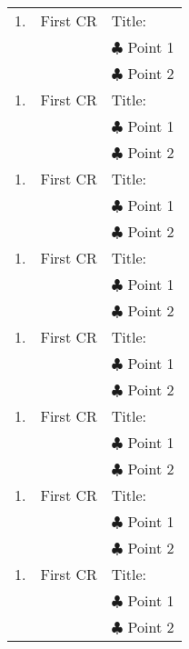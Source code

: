 \begin{longtable}{| c | c | L{11cm} |}
	1. &									   %
	First CR &								   %
	Title:\\
	{} &									   %
	{} &									   %
	$\clubsuit$ Point 1 \\
	{} &									   %
	{} &									   %
	$\clubsuit$ Point 2 \\ \hline
	
	1. &									   %
	First CR &								   %
	Title:\\
	{} &									   %
	{} &									   %
	$\clubsuit$ Point 1 \\
	{} &									   %
	{} &									   %
	$\clubsuit$ Point 2 \\ \hline
	
	1. &									   %
	First CR &								   %
	Title:\\
	{} &									   %
	{} &									   %
	$\clubsuit$ Point 1 \\
	{} &									   %
	{} &									   %
	$\clubsuit$ Point 2 \\ \hline
	
	1. &									   %
	First CR &								   %
	Title:\\
	{} &									   %
	{} &									   %
	$\clubsuit$ Point 1 \\
	{} &									   %
	{} &									   %
	$\clubsuit$ Point 2 \\ \hline
	
	1. &									   %
	First CR &								   %
	Title:\\
	{} &									   %
	{} &									   %
	$\clubsuit$ Point 1 \\
	{} &									   %
	{} &									   %
	$\clubsuit$ Point 2 \\ \hline
	
	1. &									   %
	First CR &								   %
	Title:\\
	{} &									   %
	{} &									   %
	$\clubsuit$ Point 1 \\
	{} &									   %
	{} &									   %
	$\clubsuit$ Point 2 \\ \hline
	
	1. &									   %
	First CR &								   %
	Title:\\
	{} &									   %
	{} &									   %
	$\clubsuit$ Point 1 \\
	{} &									   %
	{} &									   %
	$\clubsuit$ Point 2 \\ \hline
	
	1. &									   %
	First CR &								   %
	Title:\\
	{} &									   %
	{} &									   %
	$\clubsuit$ Point 1 \\
	{} &									   %
	{} &									   %
	$\clubsuit$ Point 2 \\ \hline											
\end{longtable}